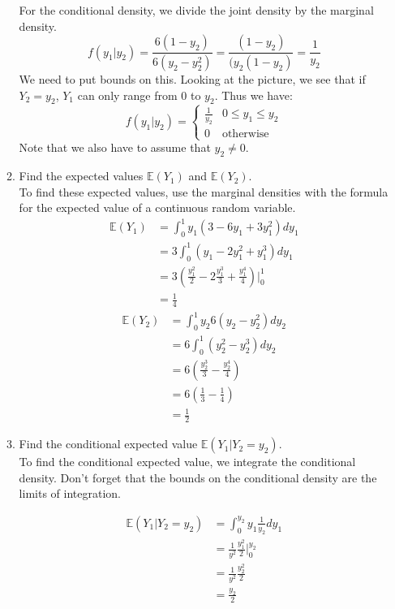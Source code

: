 \documentclass[12pt]{article}
\def\E{{\mathbb E}}
\begin{document}
\begin{enumerate}
\begin{enumerate}
For the conditional density, we divide the joint density by the marginal density.
\[
f(y_1|y_2) = \frac{6(1 - y_2)}{6( y_2 - y_2^2) } = \frac{(1 - y_2)}{( y_2(1 - y_2) } = \frac{1}{y_2}
\]
We need to put bounds on this. Looking at the picture, we see that if $Y_2 = y_2$, $Y_1$ can only range from 0 to $y_2$. Thus we have:
\[
f(y_1|y_2) = \begin{cases}
\frac{1}{y_2} & 0 \leq y_1 \leq y_2 \\
0 & \text{otherwise}
\end{cases}
\]
Note that we also have to assume that $y_2 \neq 0$.

\item Find the expected values $\E(Y_1)$ and $\E(Y_2)$.\\

To find these expected values, use the marginal densities with the formula for the expected value of a continuous random variable.
\begin{align*}
\E(Y_1) &= \int_0^1 y_1(3 - 6y_1 + 3 y_1^2) dy_1 \\
&= 3 \int_0^1 (y_1 - 2y_1^2 + y_1^3) dy_1 \\
&= 3 \left( \frac{y_1^2}{2} - 2 \frac{y_1^3}{3} + \frac{y_1^4}{4} \right)\Bigr|_0^1 \\
&= \frac{1}{4}
\end{align*}
\begin{align*}
\E(Y_2) &= \int_0^1 y_2 6( y_2 - y_2^2) dy_2 \\
&= 6 \int_0^1 (y_2^2 - y_2^3) dy_2 \\
&= 6 \left( \frac{y_2^3}{3} - \frac{y_2^4}{4} \right) \\
&= 6 \left( \frac{1}{3} - \frac{1}{4} \right) \\
&= \frac{1}{2}
\end{align*}

\item Find the conditional expected value $\E(Y_1 | Y_2 = y_2)$.\\

To find the conditional expected value, we integrate the conditional density. Don't forget that the bounds on the conditional density are the limits of integration.

\begin{align*}
\E(Y_1 | Y_2 = y_2) &= \int_0^{y_2} y_1 \frac{1}{y_2} dy_1 \\
&= \frac{1}{y^2} \frac{y_1^2}{2} \Bigr|_0^{y_2} \\\
&= \frac{1}{y^2} \frac{y_2^2}{2} \\
&= \frac{y_2}{2}
\end{align*}


\end{enumerate}
\end{enumerate}
\end{document}
